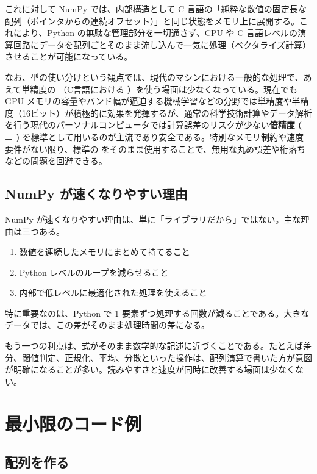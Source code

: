 これに対して NumPy では、内部構造として C 言語の「純粋な数値の固定長な配列（ポインタからの連続オフセット）」と同じ状態をメモリ上に展開する。これにより、Python の無駄な管理部分を一切通さず、CPU や C 言語レベルの演算回路にデータを配列ごとそのまま流し込んで一気に処理（ベクタライズ計算）させることが可能になっている。

なお、型の使い分けという観点では、現代のマシンにおける一般的な処理で、あえて単精度の （C言語における ）を使う場面は少なくなっている。現在でも GPU メモリの容量やバンド幅が逼迫する機械学習などの分野では単精度や半精度（16ビット）が積極的に効果を発揮するが、通常の科学技術計算やデータ解析を行う現代のパーソナルコンピュータでは計算誤差のリスクが少ない\textbf{倍精度 ( = )} を標準として用いるのが主流であり安全である。特別なメモリ制約や速度要件がない限り、標準の  をそのまま使用することで、無用な丸め誤差や桁落ちなどの問題を回避できる。

\subsection{NumPy が速くなりやすい理由}

NumPy が速くなりやすい理由は、単に「ライブラリだから」ではない。主な理由は三つある。

\begin{enumerate}
\item 数値を連続したメモリにまとめて持てること
\item Python レベルのループを減らせること
\item 内部で低レベルに最適化された処理を使えること
\end{enumerate}

特に重要なのは、Python で 1 要素ずつ処理する回数が減ることである。大きなデータでは、この差がそのまま処理時間の差になる。

もう一つの利点は、式がそのまま数学的な記述に近づくことである。たとえば差分、閾値判定、正規化、平均、分散といった操作は、配列演算で書いた方が意図が明確になることが多い。読みやすさと速度が同時に改善する場面は少なくない。

\section{最小限のコード例}

\subsection{配列を作る}

